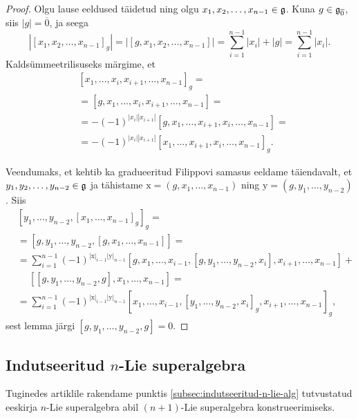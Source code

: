 \begin{proof}
    Olgu lause eeldused täidetud ning olgu
    $x_1, x_2, \dots, x_{n-1} \in \mathfrak{g}$. Kuna
    $g \in \mathfrak{g}_{\overline{0}}$, siis $|g| = \overline{0}$, ja seega
    \[
        |[x_1, x_2, \dots, x_{n-1}]_g| =
        |[g, x_1, x_2, \dots, x_{n-1}]| =
        \sum_{i=1}^{n-1} |x_i| + |g| =
        \sum_{i=1}^{n-1} |x_i|.
    \]
    Kaldsümmeetrilisuseks märgime, et
    \begin{align*}
        &[x_1, \dots, x_i, x_{i+1}, \dots, x_{n-1}]_g = \\
        &=[g, x_1, \dots, x_i, x_{i+1}, \dots, x_{n-1}] = \\
        &=-(-1)^{|x_i||x_{i+1}|}
            [g, x_1, \dots, x_{i+1}, x_i, \dots, x_{n-1}] = \\
        &=-(-1)^{|x_i||x_{i+1}|}
            [x_1, \dots, x_{i+1}, x_i, \dots, x_{n-1}]_g.
    \end{align*}

    Veendumaks, et kehtib ka gradueeritud Filippovi samasus
    eeldame täiendavalt, et $y_1, y_2, \dots, y_{n-2} \in \mathfrak{g}$ ja tähistame
    $\mathrm{x} = (g, x_1, \dots, x_{n-1})$ ning
    $\mathrm{y} = (g, y_1, \dots, y_{n-2})$. Siis
    \begin{align*}
        & [y_1, \dots, y_{n-2}, [x_1, \dots, x_{n-1}]_g]_g = \\
        &= [g, y_1, \dots, y_{n-2}, [g, x_1, \dots, x_{n-1}]] = \\
        &= \sum_{i=1}^{n-1} (-1)^{
            |\mathrm{x}|_{i-1} |\mathrm{y}|_{n-1}
        } [g, x_1, \dots, x_{i-1}, [g, y_1, \dots, y_{n-2}, x_i],
            x_{i+1}, \dots, x_{n-1}] + \\
        &\quad\ [[g, y_1, \dots, y_{n-2}, g], x_1, \dots, x_{n-1}] = \\
        &= \sum_{i=1}^{n-1} (-1)^{
            |\mathrm{x}|_{i-1} |\mathrm{y}|_{n-1}
        } [x_1, \dots, x_{i-1}, [y_1, \dots, y_{n-2}, x_i]_g,
            x_{i+1}, \dots, x_{n-1}]_g,
    \end{align*}
    sest lemma järgi $[g, y_1, \dots, y_{n-2}, g] = 0$.
\end{proof}

\subsection{Indutseeritud \texorpdfstring{$n$}{n}-Lie superalgebra}

Tuginedes artiklile \cite{Abramov:2014} rakendame punktis
\ref{subsec:indutseeritud-n-lie-alg} tutvustatud eeskirja $n$-Lie superalgebra
abil $(n+1)$-Lie superalgebra konstrueerimiseks.

